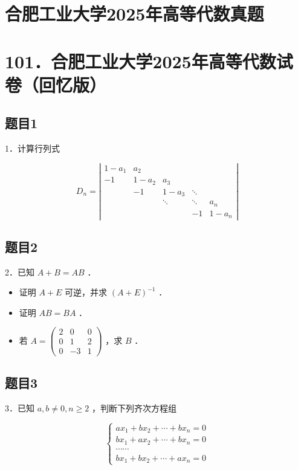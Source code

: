 \documentclass{article}
\begin{document}
\section*{合肥工业大学2025年高等代数真题}
\section*{101．合肥工业大学2025年高等代数试卷（回忆版）}

\subsection{题目1}
1．计算行列式

\[
D_{n}=\left|\begin{array}{ccccc}
1-a_{1} & a_{2} & & & \\
-1 & 1-a_{2} & a_{3} & & \\
& -1 & 1-a_{3} & \ddots & \\
& & \ddots & \ddots & a_{n} \\
& & & -1 & 1-a_{n}
\end{array}\right|
\]

\subsection{题目2}
2．已知 \(A+B=A B\) ．

\begin{itemize}
  \item[（1）] 证明 \(A+E\) 可逆，并求 \((A+E)^{-1}\) ．
  \item[（2）] 证明 \(A B=B A\) ．
  \item[（3）] 若 \(A=\left(\begin{array}{ccc}2 & 0 & 0 \\ 0 & 1 & 2 \\ 0 & -3 & 1\end{array}\right)\) ，求 \(B\) ．
\end{itemize}

\subsection{题目3}
3．已知 \(a, b \neq 0, n \geq 2\) ，判断下列齐次方程组

\[
\left\{\begin{array}{c}
a x_{1}+b x_{2}+\cdots+b x_{n}=0 \\
b x_{1}+a x_{2}+\cdots+b x_{n}=0 \\
\cdots \cdots \\
b x_{1}+b x_{2}+\cdots+a x_{n}=0
\end{array}\right.
\]
\end{document}
